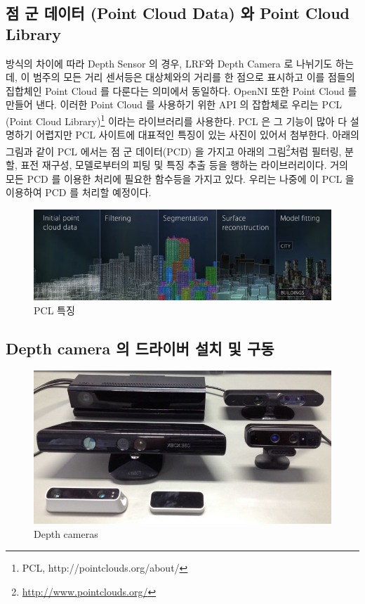 \subsection{점 군 데이터 (Point Cloud Data) 와 Point Cloud Library}

방식의 차이에 따라 Depth Sensor 의 경우, LRF와 Depth Camera 로 나뉘기도 하는데, 이 범주의 모든 거리 센서등은 대상체와의 거리를 한 점으로 표시하고 이를 점들의 집합체인 Point Cloud 를 다룬다는 의미에서 동일하다. OpenNI 또한 Point Cloud 를 만들어 낸다. 이러한 Point Cloud 를 사용하기 위한 API 의 잡합체로 우리는 PCL (Point Cloud Library)\footnote{PCL, http://pointclouds.org/about/} 이라는 라이브러리를 사용한다. PCL 은 그 기능이 많아 다 설명하기 어렵지만 PCL 사이트에 대표적인 특징이 있는 사진이 있어서 첨부한다. 아래의 그림과 같이 PCL 에서는 점 군 데이터(PCD) 을 가지고 아래의 그림\footnote{\url{http://www.pointclouds.org/}}처럼 필터링, 분할, 표전 재구성, 모델로부터의 피팅 및 특징 추출 등을 행하는 라이브러리이다. 거의 모든 PCD 를 이용한 처리에 필요한 함수등을 가지고 있다. 우리는 나중에 이 PCL 을 이용하여 PCD 를 처리할 예정이다.

\begin{figure}[h]
\centering\includegraphics[width=0.9\columnwidth]{pictures/chapter9/pcl_features.jpg}
\caption{PCL 특징}
\end{figure}

\subsection{Depth camera 의 드라이버 설치 및 구동}

\begin{figure}[h]
\centering\includegraphics[width=0.7\columnwidth]{pictures/chapter9/depth_camera.jpg}
\caption{Depth cameras}
\end{figure}

